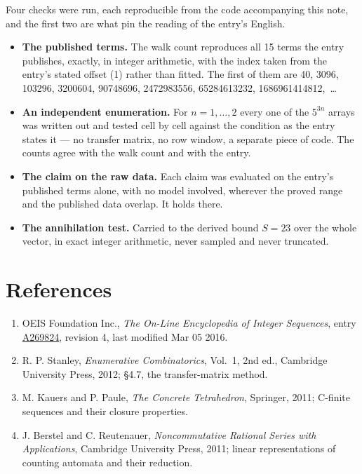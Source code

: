 \documentclass[11pt]{article}
\theoremstyle{definition}
\begin{document}
Four checks were run, each reproducible from the code accompanying this note, and the first two are what pin the reading of the entry's English.

\begin{itemize}

\item {\bfseries The published terms.} The walk count reproduces all 15 terms the entry publishes, exactly, in integer arithmetic, with the index taken from the entry's stated offset (1) rather than fitted. The first of them are 40, 3096, 103296, 3200604, 90748696, 2472983556, 65284613232, 1686961414812,~\dots

\item {\bfseries An independent enumeration.} For $n = 1,\dots,2$ every one of the $5^{3n}$ arrays was written out and tested cell by cell against the condition as the entry states it --- no transfer matrix, no row window, a separate piece of code. The counts agree with the walk count and with the entry.

\item {\bfseries The claim on the raw data.} Each claim was evaluated on the entry's published terms alone, with no model involved, wherever the proved range and the published data overlap. It holds there.

\item {\bfseries The annihilation test.} Carried to the derived bound $S = 23$ over the whole vector, in exact integer arithmetic, never sampled and never truncated.

\end{itemize}

\section{References}

\begin{enumerate}

\item OEIS Foundation Inc., \emph{The On-Line Encyclopedia of Integer Sequences}, entry \href{https://oeis.org/A269824}{A269824}, revision 4, last modified Mar 05 2016.

\item R. P. Stanley, \emph{Enumerative Combinatorics}, Vol.~1, 2nd ed., Cambridge University Press, 2012; \S4.7, the transfer-matrix method.

\item M. Kauers and P. Paule, \emph{The Concrete Tetrahedron}, Springer, 2011; C-finite sequences and their closure properties.

\item J. Berstel and C. Reutenauer, \emph{Noncommutative Rational Series with Applications}, Cambridge University Press, 2011; linear representations of counting automata and their reduction.

\end{enumerate}
\end{document}
